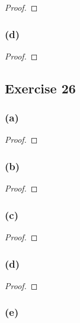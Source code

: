 \documentclass[14pt]{extarticle}
\begin{document}
\begin{proof}

\end{proof}

\subsubsection{(d)}

\begin{proof}

\end{proof}

\subsection{Exercise 26}

\subsubsection{(a)}

\begin{proof}

\end{proof}

\subsubsection{(b)}

\begin{proof}

\end{proof}

\subsubsection{(c)}

\begin{proof}

\end{proof}

\subsubsection{(d)}

\begin{proof}

\end{proof}

\subsubsection{(e)}
\end{document}
